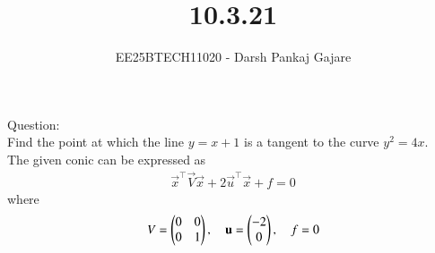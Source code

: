 \documentclass[journal,12pt,onecolumn]{IEEEtran}
\begin{document}
\title{10.3.21}
\author{EE25BTECH11020 - Darsh Pankaj Gajare}
{\let\newpage\relax\maketitle}

Question:\\
Find the point at which the line $y=x+1$ is a tangent to the curve $y^2=4x$.\\
\solution
The given conic can be expressed as
\begin{align}
	\vec{x}^\top \vec{V}\vec{x} + 2\vec{u}^\top\vec{x} + f = 0
\end{align}
where
\begin{align}
V = \begin{pmatrix}0 & 0 \\ 0 & 1\end{pmatrix}, \quad
\mathbf{u} = \begin{pmatrix}-2 \\ 0\end{pmatrix}, \quad
f = 0
\end{align}
\end{document}
